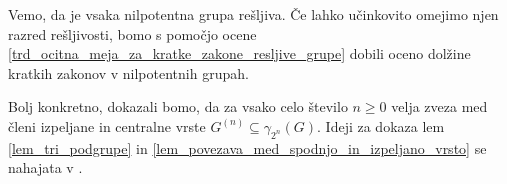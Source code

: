 

Vemo, da je vsaka nilpotentna grupa rešljiva. Če lahko učinkovito omejimo njen razred rešljivosti, bomo s pomočjo ocene \ref{trd_ocitna_meja_za_kratke_zakone_resljive_grupe} dobili oceno dolžine kratkih zakonov v nilpotentnih grupah.

Bolj konkretno, dokazali bomo, da za vsako celo število $n \ge 0$ velja zveza med členi izpeljane in centralne vrste $G^{(n)} \subseteq \gamma_{2^{n}}(G)$. Ideji za dokaza lem \ref{lem_tri_podgrupe} in \ref{lem_povezava_med_spodnjo_in_izpeljano_vrsto} se nahajata v \cite[str.~17--18]{Schneider_2016}.

